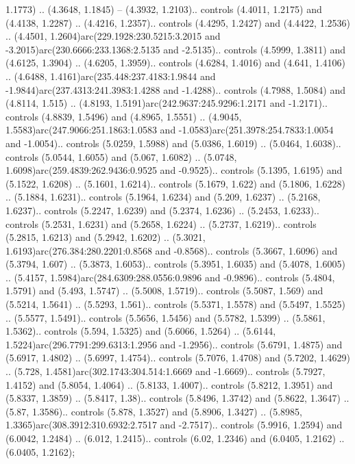 1.1773) .. (4.3648, 1.1845) -- (4.3932, 1.2103).. controls (4.4011, 1.2175) and (4.4138, 1.2287) .. (4.4216, 1.2357).. controls (4.4295, 1.2427) and (4.4422, 1.2536) .. (4.4501, 1.2604)arc(229.1928:230.5215:3.2015 and -3.2015)arc(230.6666:233.1368:2.5135 and -2.5135).. controls (4.5999, 1.3811) and (4.6125, 1.3904) .. (4.6205, 1.3959).. controls (4.6284, 1.4016) and (4.641, 1.4106) .. (4.6488, 1.4161)arc(235.448:237.4183:1.9844 and -1.9844)arc(237.4313:241.3983:1.4288 and -1.4288).. controls (4.7988, 1.5084) and (4.8114, 1.515) .. (4.8193, 1.5191)arc(242.9637:245.9296:1.2171 and -1.2171).. controls (4.8839, 1.5496) and (4.8965, 1.5551) .. (4.9045, 1.5583)arc(247.9066:251.1863:1.0583 and -1.0583)arc(251.3978:254.7833:1.0054 and -1.0054).. controls (5.0259, 1.5988) and (5.0386, 1.6019) .. (5.0464, 1.6038).. controls (5.0544, 1.6055) and (5.067, 1.6082) .. (5.0748, 1.6098)arc(259.4839:262.9436:0.9525 and -0.9525).. controls (5.1395, 1.6195) and (5.1522, 1.6208) .. (5.1601, 1.6214).. controls (5.1679, 1.622) and (5.1806, 1.6228) .. (5.1884, 1.6231).. controls (5.1964, 1.6234) and (5.209, 1.6237) .. (5.2168, 1.6237).. controls (5.2247, 1.6239) and (5.2374, 1.6236) .. (5.2453, 1.6233).. controls (5.2531, 1.6231) and (5.2658, 1.6224) .. (5.2737, 1.6219).. controls (5.2815, 1.6213) and (5.2942, 1.6202) .. (5.3021, 1.6193)arc(276.384:280.2201:0.8568 and -0.8568).. controls (5.3667, 1.6096) and (5.3794, 1.607) .. (5.3873, 1.6053).. controls (5.3951, 1.6035) and (5.4078, 1.6005) .. (5.4157, 1.5984)arc(284.6309:288.0556:0.9896 and -0.9896).. controls (5.4804, 1.5791) and (5.493, 1.5747) .. (5.5008, 1.5719).. controls (5.5087, 1.569) and (5.5214, 1.5641) .. (5.5293, 1.561).. controls (5.5371, 1.5578) and (5.5497, 1.5525) .. (5.5577, 1.5491).. controls (5.5656, 1.5456) and (5.5782, 1.5399) .. (5.5861, 1.5362).. controls (5.594, 1.5325) and (5.6066, 1.5264) .. (5.6144, 1.5224)arc(296.7791:299.6313:1.2956 and -1.2956).. controls (5.6791, 1.4875) and (5.6917, 1.4802) .. (5.6997, 1.4754).. controls (5.7076, 1.4708) and (5.7202, 1.4629) .. (5.728, 1.4581)arc(302.1743:304.514:1.6669 and -1.6669).. controls (5.7927, 1.4152) and (5.8054, 1.4064) .. (5.8133, 1.4007).. controls (5.8212, 1.3951) and (5.8337, 1.3859) .. (5.8417, 1.38).. controls (5.8496, 1.3742) and (5.8622, 1.3647) .. (5.87, 1.3586).. controls (5.878, 1.3527) and (5.8906, 1.3427) .. (5.8985, 1.3365)arc(308.3912:310.6932:2.7517 and -2.7517).. controls (5.9916, 1.2594) and (6.0042, 1.2484) .. (6.012, 1.2415).. controls (6.02, 1.2346) and (6.0405, 1.2162) .. (6.0405, 1.2162);



